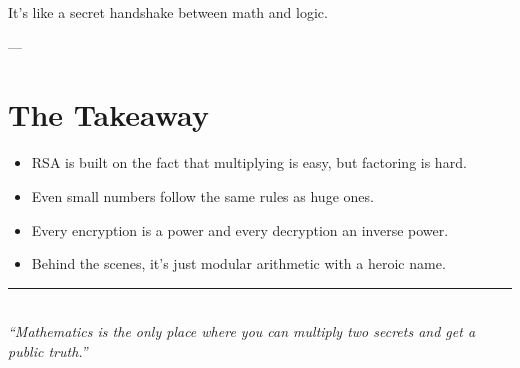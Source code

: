 \documentclass[12pt]{article}
\begin{document}
It’s like a secret handshake between math and logic.

---

\section*{The Takeaway}

\begin{itemize}
    \item RSA is built on the fact that multiplying is easy, but factoring is hard.
    \item Even small numbers follow the same rules as huge ones.
    \item Every encryption is a power and every decryption an inverse power.
    \item Behind the scenes, it’s just modular arithmetic with a heroic name.
\end{itemize}

\begin{center}
    \rule{0.7\textwidth}{0.5pt}\\[0.5em]
    \textit{“Mathematics is the only place where you can multiply two secrets and get a public truth.”}
\end{center}
\end{document}
